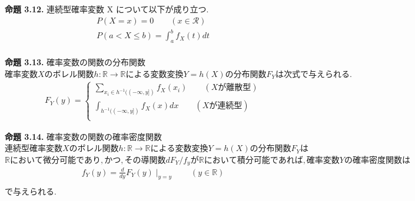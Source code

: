 \documentclass[dvipdfmx,10pt, a4j]{jarticle}
\theoremstyle{definition}
\begin{document}
    \noindent
    \textbf{命題 3.12.} 連続型確率変数 X について以下が成り立つ.\\
    \begin{align*}
        P(X = x) = 0 \qquad (x \in \mathcal{R})\\
        P(a < X \leq b) = \int_{a}^{b}{f_X(t)dt}\\
    \end{align*}
    
    \noindent
    \textbf{命題 3.13.} 確率変数の関数の分布関数\\
    $確率変数X のボレル関数h: \mathbb{R} \to \mathbb{R} による変数変換 Y = h(X)の分布関数 F_Y は次式で与えられる.$\\
    \begin{align*}
        F_Y(y) =
        \begin{cases}
            \sum_{x_i \in h^{-1}((- \infty, y])}{f_X(x_i)} \qquad (X が離散型)\\
            \int_{h^{-1}((- \infty, y])}{f_X(x)dx} \qquad (X が連続型)\\
        \end{cases}
    \end{align*}
    
    \noindent
    \textbf{命題 3.14.} 確率変数の関数の確率密度関数\\
    $連続型確率変数X のボレル関数h: \mathbb{R} \to \mathbb{R} による変数変換 Y = h(X)の分布関数 F_Y は$
    $\mathbb{R} において微分可能であり, かつ, その導関数 dF_Y/f_y が \mathbb{R} において積分可能であれば, 確率変数Y の確率密度関数は$\\
    \begin{align*}
        f_Y(y) = \frac{d}{dy}F_Y(y) \mid_{y=y} \qquad (y \in \mathbb{R})\\
    \end{align*}
    で与えられる.\\
    
\end{document}
